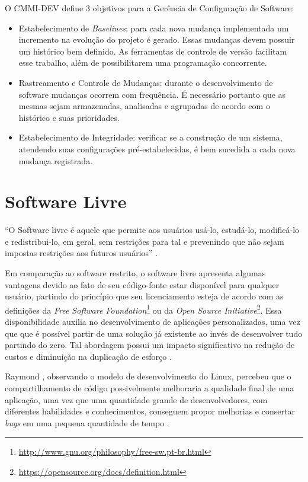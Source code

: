 O CMMI-DEV \cite{cmmi_dev} define 3 objetivos para a Gerência de Configuração de Software:
\begin{itemize}
    \item Estabelecimento de \textit{Baselines}: para cada nova mudança implementada um incremento na evolução do projeto é gerado. Essas mudanças devem possuir um histórico bem definido. As ferramentas de controle de versão facilitam esse trabalho, além de possibilitarem uma programação concorrente.
    \item Rastreamento e Controle de Mudanças: durante o desenvolvimento de software mudanças ocorrem com frequência. É necessário portanto que as mesmas sejam armazenadas, analisadas e agrupadas de acordo com o histórico e suas prioridades.
    \item Estabelecimento de Integridade: verificar se a construção de um sistema, atendendo suas configurações pré-estabelecidas, é bem sucedida a cada nova mudança registrada.
\end{itemize}

\section{Software Livre}
``O Software livre é aquele que permite aos usuários usá-lo, estudá-lo, modificá-lo e redistribui-lo, em geral, sem restrições para tal e prevenindo que não sejam impostas restrições aos futuros usuários'' \cite{meirelles2013}.

Em comparação ao software restrito, o software livre apresenta algumas vantagens devido ao fato de seu código-fonte estar disponível para qualquer usuário, partindo do princípio que seu licenciamento esteja de acordo com as definições da \textit{Free Software Foundation}\footnote{\url{http://www.gnu.org/philosophy/free-sw.pt-br.html}} ou da \textit{Open Source Initiative}\footnote{\url{https://opensource.org/docs/definition.html}}. Essa disponibilidade auxilia no desenvolvimento de aplicações personalizadas, uma vez que que é possível partir de uma solução já existente ao invés de desenvolver tudo partindo do zero. Tal abordagem possui um impacto significativo na redução de custos e diminuição na duplicação de esforço \cite{meirelles2013}.

Raymond \cite{raymond1999}, observando o modelo de desenvolvimento do Linux, percebeu que o compartilhamento de código possivelmente melhoraria a qualidade final de uma aplicação, uma vez que uma quantidade grande de desenvolvedores, com diferentes habilidades e conhecimentos, conseguem propor melhorias e consertar \textit{bugs} em uma pequena quantidade de tempo \cite{meirelles2013}.

